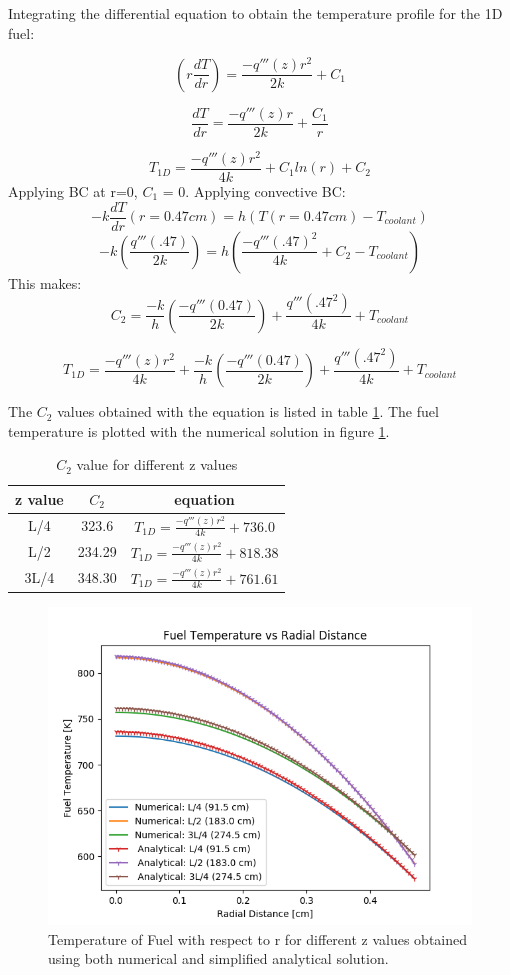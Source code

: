 \documentclass[12pt,letterpaper]{article}
\begin{document}
Integrating the differential equation to obtain the temperature profile for the
1D fuel:


\[ (r \frac{dT}{dr}) = \frac{-q'''(z)r^2}{2k} + C_1 \]

\[ \frac{dT}{dr} = \frac{-q'''(z)r}{2k} + \frac{C_1}{r} \]

\[ T_{1D} = \frac{-q'''(z)r^2}{4k} + C_1 ln(r) + C_2 \]
Applying BC at r=0, $C_1$ = 0.
Applying convective BC:
\[ -k \frac{dT}{dr}(r= 0.47 cm) = h (T(r = 0.47 cm ) - T_{coolant})\]
\[ -k( \frac{q''' (.47)}{2k}) = h (\frac{-q'''(.47)^2}{4k} + C_2 - T_{coolant})\]
This makes:
\[C_2 = \frac{-k}{h} ( \frac{-q''' (0.47)}{2k}) + \frac{q''' (.47^2)}{4k} + T_{coolant}\]

\[ T_{1D} = \frac{-q'''(z)r^2}{4k} + \frac{-k}{h} ( \frac{-q''' (0.47)}{2k}) + \frac{q''' (.47^2)}{4k} + T_{coolant}\]


The $C_2$ values obtained with the equation is listed in table \ref{tab:c2}.
The fuel temperature is plotted with the numerical solution in figure \ref{fig:num_anal}.

\begin{table}[h]
     \centering
    \begin{tabular}{ccc}
       \hline
       z value & $C_2$ & equation \\
       \hline
       L/4 & 323.6  & $T_{1D} = \frac{-q'''(z)r^2}{4k} + 736.0$ \\
       L/2 & 234.29 & $T_{1D} = \frac{-q'''(z)r^2}{4k} + 818.38$ \\
       3L/4 & 348.30 & $T_{1D} = \frac{-q'''(z)r^2}{4k} + 761.61$\\
       \hline
    \end{tabular}
    \caption {$C_2$ value for different z values}
    \label{tab:c2}
\end{table}


\begin{figure}[htbp!]
    \begin{center}
        \includegraphics[scale=0.7]{num_anal.png}
    \end{center}
    \caption{Temperature of Fuel with respect to r for different z values obtained
             using both numerical and simplified analytical solution.}
    \label{fig:num_anal}
\end{figure}
\end{document}
